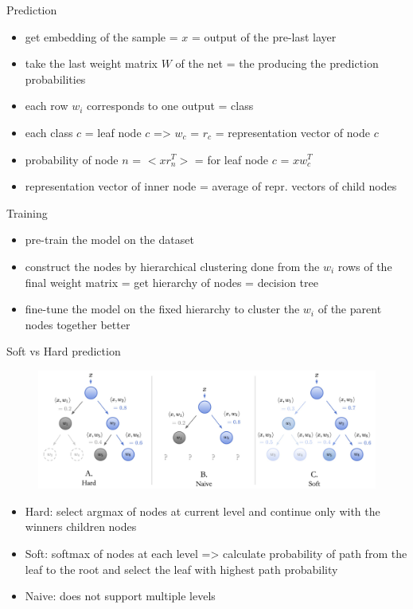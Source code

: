 \documentclass{beamer}
\begin{document}
\begin{frame}{Prediction}

\begin{itemize}
\item get embedding of the sample = $x$ = output of the pre-last layer
\item take the last weight matrix $W$ of the net = the producing the prediction probabilities
\item each row $w_i$ corresponds to one output = class
\item each class $c$ = leaf node $c$ => $w_c$ = $r_c$ = representation vector of node $c$  
\item probability of node $n$ = $<xr_n^T>$ = for leaf node $c$ = $xw_c^T$
\item representation vector of inner node = average of repr. vectors of child nodes
\end{itemize}

\end{frame}
\begin{frame}{Training}

\begin{itemize}
\item pre-train the model on the dataset
\item construct the nodes by hierarchical clustering done from the $w_i$ rows of the final weight matrix = get hierarchy of nodes = decision tree
\item fine-tune the model on the fixed hierarchy to cluster the $w_i$ of the parent nodes together better
\end{itemize}

\end{frame}
\begin{frame}{Soft vs Hard prediction}

\begin{figure}[h]
\includegraphics[width=\textwidth]{img/hard_soft}
\end{figure}

\begin{itemize}
\item Hard: select argmax of nodes at current level and continue only with the winners children nodes
\item Soft: softmax of nodes at each level => calculate probability of path from the leaf to the root and select the leaf with highest path probability
\item Naive: does not support multiple levels
\end{itemize}

\end{frame}
\end{document}
